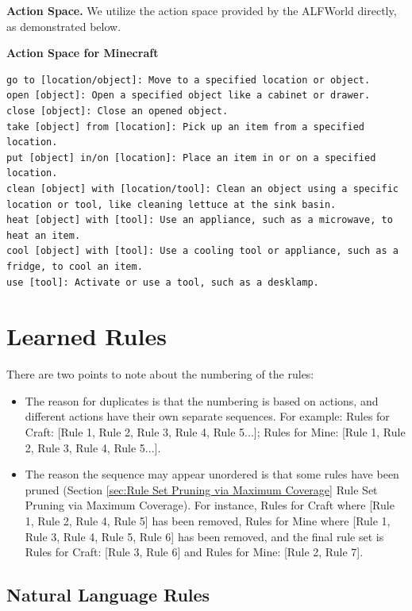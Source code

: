 \documentclass{article} %
\begin{document}
\textbf{Action Space.} We utilize the action space provided by the ALFWorld directly, as demonstrated below. 
\begin{center}
    \textbf{Action Space for Minecraft}
\end{center}
\lstset{language=}
\begin{lstlisting}
go to [location/object]: Move to a specified location or object. 
open [object]: Open a specified object like a cabinet or drawer. 
close [object]: Close an opened object.
take [object] from [location]: Pick up an item from a specified location.
put [object] in/on [location]: Place an item in or on a specified location.
clean [object] with [location/tool]: Clean an object using a specific location or tool, like cleaning lettuce at the sink basin.
heat [object] with [tool]: Use an appliance, such as a microwave, to heat an item.
cool [object] with [tool]: Use a cooling tool or appliance, such as a fridge, to cool an item.
use [tool]: Activate or use a tool, such as a desklamp.
\end{lstlisting}

\section{Learned Rules}
\label{sec:Learned Rules}

There are two points to note about the numbering of the rules:
\begin{itemize}
    \item The reason for duplicates is that the numbering is based on actions, and different actions have their own separate sequences. For example: Rules for Craft: [Rule 1, Rule 2, Rule 3, Rule 4, Rule 5...]; Rules for Mine: [Rule 1, Rule 2, Rule 3, Rule 4, Rule 5...].
    \item The reason the sequence may appear unordered is that some rules have been pruned (Section \ref{sec:Rule Set Pruning via Maximum Coverage} Rule Set Pruning via Maximum Coverage). For instance, Rules for Craft where [Rule 1, Rule 2, Rule 4, Rule 5] has been removed, Rules for Mine where [Rule 1, Rule 3, Rule 4, Rule 5, Rule 6] has been removed, and the final rule set is Rules for Craft: [Rule 3, Rule 6] and Rules for Mine: [Rule 2, Rule 7].
\end{itemize}


\subsection{Natural Language Rules}
\end{document}
